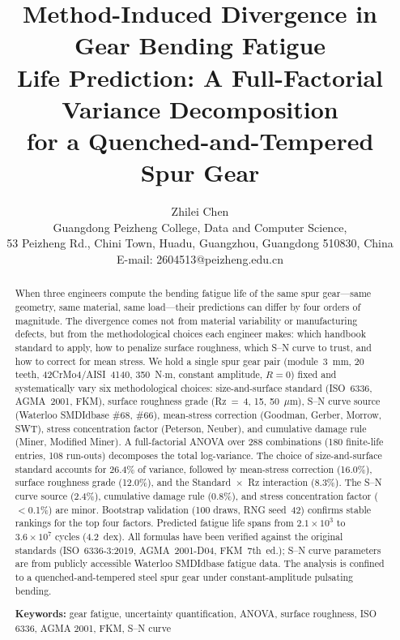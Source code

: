 \documentclass[12pt,a4paper]{article}
\begin{document}
\title{\textbf{Method-Induced Divergence in Gear Bending Fatigue\\
Life Prediction: A Full-Factorial Variance Decomposition\\
for a Quenched-and-Tempered Spur Gear}}

\author{Zhilei Chen\\
Guangdong Peizheng College, Data and Computer Science,\\
53 Peizheng Rd., Chini Town, Huadu, Guangzhou, Guangdong 510830, China\\
E-mail: 2604513@peizheng.edu.cn}

\maketitle

\begin{abstract}
\label{sec:abstract}

When three engineers compute the bending fatigue life of the same spur
gear---same geometry, same material, same load---their predictions can
differ by four orders of magnitude. The divergence comes not from
material variability or manufacturing defects, but from the
methodological choices each engineer makes: which handbook standard to
apply, how to penalize surface roughness, which S--N curve to trust,
and how to correct for mean stress. We hold a single spur gear pair
(module~3~mm, 20 teeth, 42CrMo4/AISI~4140, 350~N$\cdot$m, constant
amplitude, $R=0$) fixed and systematically vary six methodological
choices: size-and-surface standard (ISO~6336, AGMA~2001, FKM), surface
roughness grade (Rz~=~4, 15, 50~$\mu$m), S--N curve source (Waterloo
SMDIdbase \#68, \#66), mean-stress correction (Goodman, Gerber, Morrow,
SWT), stress
concentration factor (Peterson, Neuber), and cumulative damage rule
(Miner, Modified Miner). A full-factorial ANOVA over 288 combinations
(180 finite-life entries, 108 run-outs) decomposes the total log-variance.
The choice of size-and-surface standard accounts for 26.4\% of variance,
followed by mean-stress correction (16.0\%), surface roughness grade
(12.0\%), and the Standard~$\times$~Rz interaction (8.3\%). The S--N
curve source (2.4\%), cumulative damage rule (0.8\%), and stress
concentration factor ($<$0.1\%) are minor. Bootstrap validation (100
draws, RNG seed~42) confirms stable rankings for the top four factors.
Predicted fatigue life spans from $2.1\times10^3$ to $3.6\times10^7$
cycles (4.2~dex). All formulas have been verified against the original
standards (ISO~6336-3:2019, AGMA~2001-D04, FKM~7th~ed.); S--N curve
parameters are from publicly accessible Waterloo SMDIdbase fatigue
data. The analysis is confined to a quenched-and-tempered steel spur
gear under constant-amplitude pulsating bending.

\textbf{Keywords:} gear fatigue, uncertainty quantification, ANOVA,
surface roughness, ISO 6336, AGMA 2001, FKM, S--N curve
\end{abstract}
\end{document}
